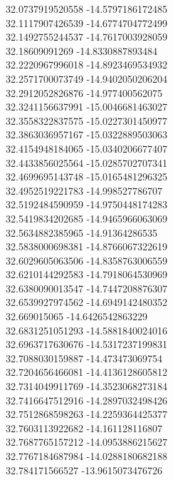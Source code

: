 {32.0737919520558	-14.5797186172485\\
32.1117907426539	-14.6774704772499\\
32.1492755244537	-14.7617003928059\\
32.18609091269	-14.8330887893484\\
32.2220967996018	-14.8923469534932\\
32.2571700073749	-14.9402050206204\\
32.2912052826876	-14.977400562075\\
32.3241156637991	-15.0046681463027\\
32.3558322837575	-15.0227301450977\\
32.3863036957167	-15.0322889503063\\
32.4154948184065	-15.0340206677407\\
32.4433856025564	-15.0285702707341\\
32.4699695143748	-15.0165481296325\\
32.4952519221783	-14.998527786707\\
32.5192484590959	-14.9750448174283\\
32.5419834202685	-14.9465966063069\\
32.5634882385965	-14.91364286535\\
32.5838000698381	-14.8766067322619\\
32.6029605063506	-14.8358763006559\\
32.6210144292583	-14.7918064530969\\
32.6380090013547	-14.7447208876307\\
32.6539927974562	-14.6949142480352\\
32.669015065	-14.6426542863229\\
32.6831251051293	-14.5881840024016\\
32.6963717630676	-14.5317237199831\\
32.7088030159887	-14.473473069754\\
32.7204656466081	-14.4136128605812\\
32.7314049911769	-14.3523068273184\\
32.7416647512916	-14.2897032498426\\
32.7512868598263	-14.2259364425377\\
32.7603113922682	-14.161128116807\\
32.7687765157212	-14.0953886215627\\
32.7767184687984	-14.0288180682188\\
32.784171566527	-13.9615073476726\\
}
